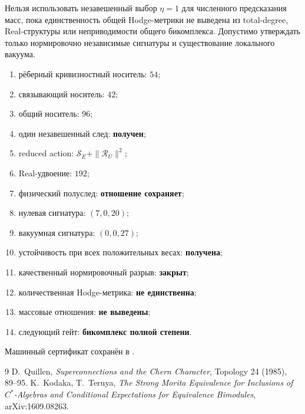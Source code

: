\begin{nogocriterion}
Нельзя использовать незавешенный выбор $\eta=1$ для численного предсказания
масс, пока единственность общей Hodge-метрики не выведена из total-degree,
Real-структуры или неприводимости общего бикомплекса. Допустимо утверждать
только нормировочно независимые сигнатуры и существование локального
вакуума.
\end{nogocriterion}

\begin{protocol}
\begin{enumerate}
 \item рёберный кривизностный носитель: \textbf{$54$};
 \item связывающий носитель: \textbf{$42$};
 \item общий носитель: \textbf{$96$};
 \item один незавешенный след: \textbf{получен};
 \item reduced action: \textbf{$\mathcal S_E+\|\mathcal R_U\|^2$};
 \item Real-удвоение: \textbf{$192$};
 \item физический полуслед: \textbf{отношение сохраняет};
 \item нулевая сигнатура: \textbf{$(7,0,20)$};
 \item вакуумная сигнатура: \textbf{$(0,0,27)$};
 \item устойчивость при всех положительных весах: \textbf{получена};
 \item качественный нормировочный разрыв: \textbf{закрыт};
 \item количественная Hodge-метрика: \textbf{не единственна};
 \item массовые отношения: \textbf{не выведены};
 \item следующий гейт: \textbf{бикомплекс полной степени}.
\end{enumerate}
\end{protocol}

Машинный сертификат сохранён в
.

\begin{thebibliography}{9}
D.~Quillen,
\emph{Superconnections and the Chern Character},
Topology 24 (1985), 89--95.
K.~Kodaka, T.~Teruya,
\emph{The Strong Morita Equivalence for Inclusions of $C^*$-Algebras and
Conditional Expectations for Equivalence Bimodules},
arXiv:1609.08263.
\end{thebibliography}